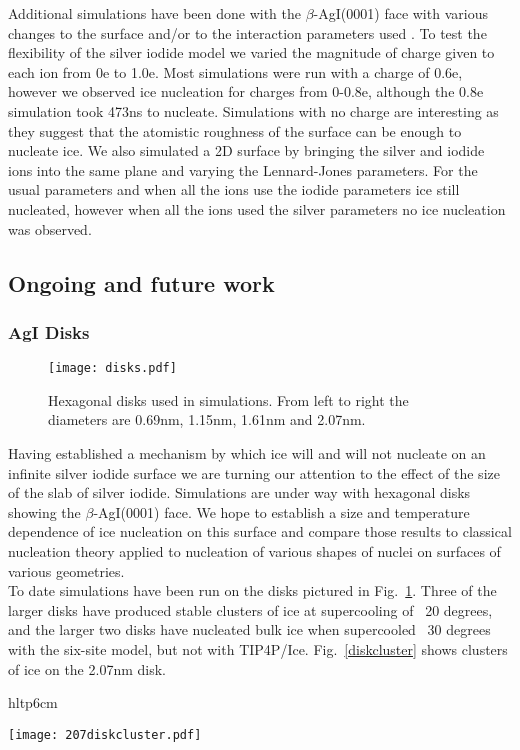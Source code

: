 \documentclass[titlepage]{article}
\begin{document}
\indent Additional simulations have been done with the $\beta$-AgI(0001) face with various changes to the surface and/or to the interaction parameters used .  To test the flexibility of the silver iodide model we varied the magnitude of charge given to each ion from 0e to 1.0e.  Most simulations were run with a charge of 0.6e, however we observed ice nucleation for charges from 0-0.8e, although the 0.8e simulation took 473ns to nucleate.  Simulations with no charge are interesting as they suggest that the atomistic roughness of the surface can be enough to nucleate ice.  We also simulated a 2D surface by bringing the silver and iodide ions into the same plane and varying the Lennard-Jones parameters.  For the usual parameters and when all the ions use the iodide parameters ice still nucleated, however when all the ions used the silver parameters no ice nucleation was observed.
\subsection{Ongoing and future work}
\subsubsection{AgI Disks}
\begin{figure}[htp]
	\begin{center}
		\texttt{[image: disks.pdf]}
		\label{disks}
		\caption{Hexagonal disks used in simulations.  From left to right the diameters are 0.69nm, 1.15nm, 1.61nm and 2.07nm.}
	\end{center}
\end{figure}




\indent Having established a mechanism by which ice will and will not nucleate on an infinite silver iodide surface we are turning our attention to the effect of the size of the slab of silver iodide.  Simulations are under way with hexagonal disks showing the $\beta$-AgI(0001) face.  We hope to establish a size and temperature dependence of ice nucleation on this surface and compare those results to classical nucleation theory applied to nucleation of various shapes of nuclei on surfaces of various geometries\cite{F63}.\\
\indent To date simulations have been run on the disks pictured in Fig.~\ref{disks}.  Three of the larger disks have produced stable clusters of ice at supercooling of ~20 degrees, and the larger two disks have nucleated bulk ice when supercooled ~30 degrees with the six-site model, but not with TIP4P/Ice.  Fig.~\ref{diskcluster} shows clusters of ice on the 2.07nm disk.
\begin{wrapfigure}{hltp}{6cm}
	\begin{center}
		\texttt{[image: 207diskcluster.pdf]}
		\caption{Clusters of ice on two facing $\beta$-AgI(0001) disks.  Silver and iodide ions and hydrogen are silver, green and black respectively.  Oxygen of hexagonal and cubic ice are blue and orange respectively.}
	\end{center}
	\label{diskcluster}
\end{wrapfigure}
\end{document}
